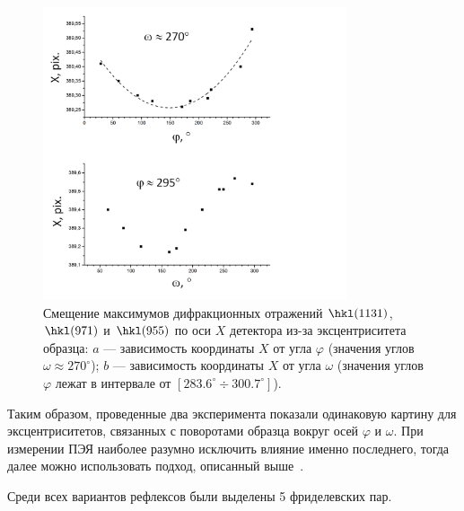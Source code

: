 \documentclass[a4paper,14pt]{extarticle}
\newcommand{\degree}{^\circ}
\newcommand{\range}[2]{[#1\div#2]}
\newcounter{x}
\begin{document}
\begin{figure}[ht!]
    \centering
    \includegraphics[width=0.8\textwidth]{eccentrSi.png}
    \caption{Смещение максимумов дифракционных отражений $\hkl(11 3 1)$, $\hkl(9 7 1)$ и $\hkl(9 5 5)$ по оси $X$ детектора из-за эксцентриситета образца: $a$ --– зависимость координаты $X$ от угла $\varphi$ (значения углов $\omega \approx 270\degree$); $b$ --- зависимость координаты $X$ от угла $\omega$ (значения углов $\varphi$ лежат в интервале от $\range{283.6\degree}{300.7\degree}$).}
    \label{fig:eccentrSi}
\end{figure}

Таким образом, проведенные два эксперимента показали одинаковую картину для эксцентриситетов, связанных с поворотами образца вокруг осей $\varphi$ и $\omega$.
При измерении ПЭЯ наиболее разумно исключить влияние именно последнего, тогда далее можно использовать подход, описанный выше~\cite{Ponomarev:1969}.

Среди всех вариантов рефлексов были выделены 5 фриделевских пар.
\end{document}
